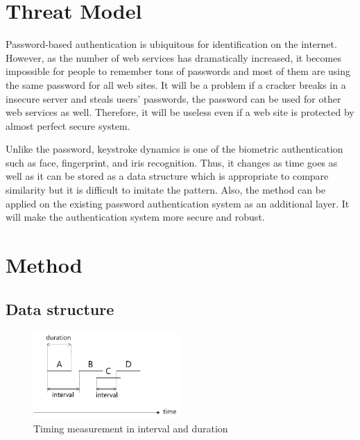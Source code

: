 \documentclass[twocolumn,showpacs,%
  nofootinbib,aps,%
  eqsecnum,prd,notitlepage,showkeys,10pt]{revtex4-1}
\begin{document}
\section{Threat Model}
Password-based authentication is ubiquitous for identification on the internet. However, as the number of web services has dramatically increased, it becomes impossible for people to remember tons of passwords and most of them are using the same password for all web sites. It will be a problem if a cracker breaks in a insecure server and steals users' passwords, the password can be used for other web services as well. Therefore, it will be useless even if a web site is protected by almost perfect secure system.\par
Unlike the password, keystroke dynamics is one of the biometric authentication such as face, fingerprint, and iris recognition\cite{karnan2011biometric}. Thus, it changes as time goes as well as it can be stored as a data structure which is appropriate to compare similarity but it is difficult to imitate the pattern. Also, the method can be applied on the existing password authentication system as an additional layer. It will make the authentication system more secure and robust.

\section{Method}
\subsection{Data structure}
\begin{figure}[h]
  \centering
  \includegraphics[width=0.5\textwidth]{keystroke}
  \caption{Timing measurement in interval and duration}
  \label{fig:keystroke}
\end{figure}
\end{document}
